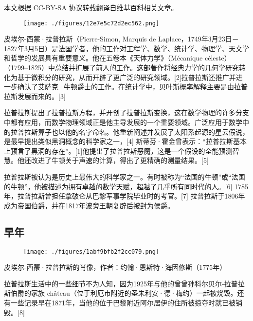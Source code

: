 
本文根据 CC-BY-SA 协议转载翻译自维基百科\href{https://en.wikipedia.org/wiki/Pierre-Simon_Laplace}{相关文章}。

\begin{figure}[ht]
\centering
\texttt{[image: ./figures/12e7e5c72d2ec562.png]}
\caption{} \label{fig_LPLS_1}
\end{figure}
皮埃尔-西蒙·拉普拉斯（Pierre-Simon, Marquis de Laplace，1749年3月23日－1827年3月5日）是法国学者，他的工作对工程学、数学、统计学、物理学、天文学和哲学的发展具有重要意义。他在五卷本《天体力学》（Mécanique céleste）（1799–1825）中总结并扩展了前人的工作。这部著作将经典力学的几何学研究转化为基于微积分的研究，从而开辟了更广泛的研究领域。[2]拉普拉斯还推广并进一步确认了艾萨克·牛顿爵士的工作。在统计学中，贝叶斯概率解释主要是由拉普拉斯发展而来的。[3]

拉普拉斯提出了拉普拉斯方程，并开创了拉普拉斯变换，这在数学物理的许多分支中都有应用，而数学物理领域正是他主导发展的一个重要领域。广泛应用于数学中的拉普拉斯算子也以他的名字命名。他重新阐述并发展了太阳系起源的星云假说，是最早提出类似黑洞概念的科学家之一，[4] 斯蒂芬·霍金曾表示：“拉普拉斯基本上预言了黑洞的存在”。[1]他提出了拉普拉斯恶魔，这是一个假设的全能预测智慧。他还改进了牛顿关于声速的计算，得出了更精确的测量结果。[5]

拉普拉斯被认为是历史上最伟大的科学家之一。有时被称为“法国的牛顿”或“法国的牛顿”，他被描述为拥有卓越的数学天赋，超越了几乎所有同时代的人。[6] 1785年，拉普拉斯曾担任拿破仑从巴黎军事学院毕业时的考官。[7] 拉普拉斯于1806年成为帝国伯爵，并在1817年波旁王朝复辟后被封为侯爵。
\subsection{早年}
\begin{figure}[ht]
\centering
\texttt{[image: ./figures/1abf9bfb2f2cc079.png]}
\caption{} \label{fig_LPLS_2}
\end{figure}
皮埃尔-西蒙·拉普拉斯的肖像，作者：约翰·恩斯特·海因修斯（1775年）

拉普拉斯生活中的一些细节不为人知，因为1925年与他的曾曾孙科尔贝尔-拉普拉斯伯爵的家族 château（位于利厄市附近的圣朱利安·德·梅约）一起被烧毁。还有一些记录早在1871年，当他的位于巴黎附近阿尔居伊的住所被掠夺时就已被销毁。[8]